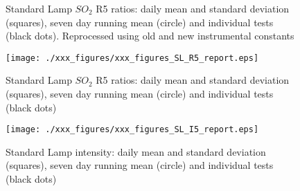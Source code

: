 \begin{figure}[hbtp!]
\begin{center}

{%
  \caption{Standard Lamp $SO_2$ R5 ratios: daily mean and standard deviation (squares), seven day running mean (circle) and individual tests (black dots). Reprocessed using old and new instrumental constants}
	\label{fig:SL_R5_report}
}
{%
	\texttt{[image: ./xxx\_figures/xxx\_figures\_SL\_R5\_report.eps]}
	\caption{Standard Lamp $SO_2$ R5 ratios: daily mean and standard deviation (squares), seven day running mean (circle) and individual tests (black dots)}
	\label{fig:SL_R5_report}
}

\end{center}
\end{figure}


 \begin{figure}[hbtp!]
 \begin{center}
		\texttt{[image: ./xxx\_figures/xxx\_figures\_SL\_I5\_report.eps]}
		\caption{Standard Lamp intensity: daily mean and standard deviation (squares), seven day running mean (circle) and individual tests (black dots)}
		\label{fig:SL_I5_report}
 \end{center}
 \end{figure}